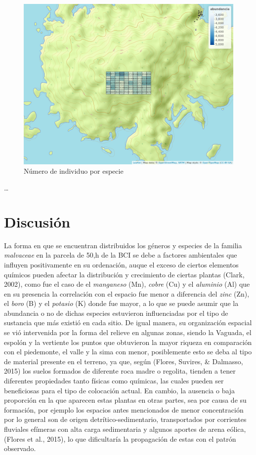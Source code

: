 \documentclass[11pt,]{article}
\begin{document}
\begin{figure}
\centering
\includegraphics[width=1.10000\textwidth]{mapa_cuadros_abun_global.png}
\caption{Número de individuo por especie\label{riquezas}}
\end{figure}

\ldots

\section{Discusión}\label{discusiuxf3n}

La forma en que se encuentran distribuidos los géneros y especies de la
familia \emph{malvaceae} en la parcela de 50,h de la BCI se debe a
factores ambientales que influyen positivamente en su ordenación, auque
el exceso de ciertos elementos químicos pueden afectar la distribución y
crecimiento de ciertas plantas (Clark, 2002), como fue el caso de el
\emph{manganeso} (Mn), \emph{cobre} (Cu) y el \emph{aluminio} (Al) que
en su presencia la correlación con el espacio fue menor a diferencia del
\emph{zinc} (Zn), el \emph{boro} (B) y el \emph{potasio} (K) donde fue
mayor, a lo que se puede asumir que la abundancia o no de dichas
especies estuvieron influenciadas por el tipo de sustancia que más
existió en cada sitio. De igual manera, su organización espacial se vió
intervenida por la forma del relieve en algunas zonas, siendo la
Vaguada, el espolón y la vertiente los puntos que obtuvieron la mayor
riqueza en comparación con el piedemonte, el valle y la sima con menor,
posiblemente esto se deba al tipo de material presente en el terreno, ya
que, según (Flores, Suvires, \& Dalmasso, 2015) los suelos formados de
diferente roca madre o regolita, tienden a tener diferentes propiedades
tanto físicas como químicas, las cuales pueden ser beneficiosas para el
tipo de colocación actual. En cambio, la ausencia o baja proporción en
la que aparecen estas plantas en otras partes, sea por causa de su
formación, por ejemplo los espacios antes mencionados de menor
concentración por lo general son de origen detrítico-sedimentario,
transportados por corrientes fluviales efímeras con alta carga
sedimentaria y algunos aportes de arena eólica, (Flores et al., 2015),
lo que dificultaría la propagación de estas con el patrón observado.
\end{document}
